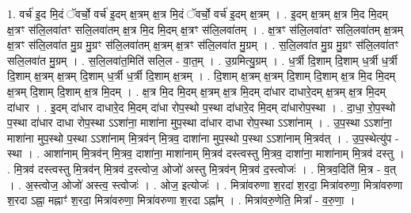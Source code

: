 \documentclass[17pt]{extarticle}
\begin{document}
1. वर्च॑ इ॒द मि॒दं ॅवर्चो॒ वर्च॑ इ॒दम् क्ष॒त्रम् क्ष॒त्र मि॒दं ॅवर्चो॒ वर्च॑ इ॒दम् क्ष॒त्रम् । . इ॒दम् क्ष॒त्रम् क्ष॒त्र मि॒द मि॒दम् क्ष॒त्रꣳ स॑लि॒लवा॑तꣳ सलि॒लवा॑तम् क्ष॒त्र मि॒द मि॒दम् क्ष॒त्रꣳ स॑लि॒लवा॑तम् । . क्ष॒त्रꣳ स॑लि॒लवा॑तꣳ सलि॒लवा॑तम् क्ष॒त्रम् क्ष॒त्रꣳ स॑लि॒लवा॑त मु॒ग्र मु॒ग्रꣳ स॑लि॒लवा॑तम् 
क्ष॒त्रम् क्ष॒त्रꣳ स॑लि॒लवा॑त मु॒ग्रम् । . स॒लि॒लवा॑त मु॒ग्र मु॒ग्रꣳ स॑लि॒लवा॑तꣳ सलि॒लवा॑त मु॒ग्रम् । . स॒लि॒लवा॑त॒मिति॑ सलि॒ल - वा॒त॒म् । . उ॒ग्रमित्यु॒ग्रम् । . ध॒र्त्री दि॒शाम् दि॒शाम् ध॒र्त्री ध॒र्त्री दि॒शाम् क्ष॒त्रम् क्ष॒त्रम् दि॒शाम् ध॒र्त्री ध॒र्त्री दि॒शाम् क्ष॒त्रम् । . दि॒शाम् क्ष॒त्रम् क्ष॒त्रम् दि॒शाम् दि॒शाम् क्ष॒त्र मि॒द मि॒दम् क्ष॒त्रम् दि॒शाम् दि॒शाम् क्ष॒त्र मि॒दम् । . क्ष॒त्र मि॒द मि॒दम् क्ष॒त्रम् क्ष॒त्र मि॒दम् दा॑धार दाधारे॒दम् क्ष॒त्रम् क्ष॒त्र मि॒दम् दा॑धार । . इ॒दम् दा॑धार दाधारे॒द मि॒दम् दा॑धा रोप॒स्थो प॒स्था दा॑धारे॒द मि॒दम् दा॑धारोप॒स्था । . दा॒धा॒ रो॒प॒स्थो प॒स्था दा॑धार दाधा रोप॒स्था ऽऽशा॑ना॒ माशा॑ना मुप॒स्था दा॑धार दाधा रोप॒स्था ऽऽशा॑नाम् । . उ॒प॒स्था ऽऽशा॑ना॒ माशा॑ना मुप॒स्थो प॒स्था ऽऽशा॑नाम् मि॒त्रव॑न् मि॒त्रव॒ दाशा॑ना मुप॒स्थो प॒स्था ऽऽशा॑नाम् मि॒त्रव॑त् । . उ॒प॒स्थेत्यु॑प - स्था । . आशा॑नाम् मि॒त्रव॑न् मि॒त्रव॒ दाशा॑ना॒ माशा॑नाम् मि॒त्रव॑ दस्त्वस्तु मि॒त्रव॒ दाशा॑ना॒ माशा॑नाम् मि॒त्रव॑ दस्तु । . मि॒त्रव॑ दस्त्वस्तु मि॒त्रव॑न् मि॒त्रव॑ द॒स्त्वोज॒ ओजो॑ अस्तु मि॒त्रव॑न् मि॒त्रव॑ द॒स्त्वोजः॑ । . मि॒त्रव॒दिति॑ मि॒त्र - व॒त् । . अ॒स्त्वोज॒ ओजो॑ अस्त्व॒ स्त्वोजः॑ । . ओज॒ इत्योजः॑ । . मित्रा॑वरुणा श॒रदा॑ श॒रदा॒ मित्रा॑वरुणा॒ मित्रा॑वरुणा श॒रदा ऽह्ना॒ मह्नाꣳ॑ श॒रदा॒ मित्रा॑वरुणा॒ मित्रा॑वरुणा श॒रदा ऽह्ना᳚म् । . मित्रा॑वरु॒णेति॒ मित्रा᳚ - व॒रु॒णा॒ । \newline
\end{document}
